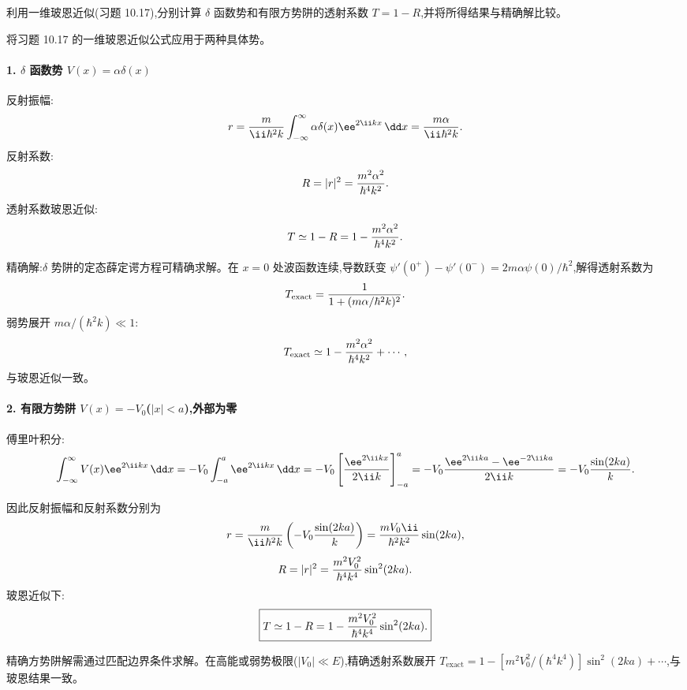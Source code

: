 \begin{question}
利用一维玻恩近似(习题 10.17),分别计算 $\delta$ 函数势和有限方势阱的透射系数 $T=1-R$,并将所得结果与精确解比较。
\end{question}
\begin{solution}
将习题 10.17 的一维玻恩近似公式应用于两种具体势。

\paragraph{1. $\delta$ 函数势 $V(x)=\alpha\delta(x)$}

反射振幅:
\[
r={m\over\ii\hbar^2k}\int_{-\infty}^{\infty}\alpha\delta(x)\ee^{2\ii kx}\,\dd x
={m\alpha\over\ii\hbar^2k}.
\]
反射系数:
\[
R=|r|^2={m^2\alpha^2\over\hbar^4k^2}.
\]
透射系数玻恩近似:
\[
T\simeq1-R=1-{m^2\alpha^2\over\hbar^4k^2}.
\]

精确解:$\delta$ 势阱的定态薛定谔方程可精确求解。在 $x=0$ 处波函数连续,导数跃变 $\psi'(0^+)-\psi'(0^-)=2m\alpha\psi(0)/\hbar^2$,解得透射系数为
\[
T_{\text{exact}}={1\over1+(m\alpha/\hbar^2k)^2}.
\]
弱势展开 $m\alpha/(\hbar^2k)\ll1$:
\[
T_{\text{exact}}\simeq 1-{m^2\alpha^2\over\hbar^4k^2}+\cdots,
\]
与玻恩近似一致。

\paragraph{2. 有限方势阱 $V(x)=-V_0$($|x|<a$),外部为零}

傅里叶积分:
\[
\int_{-\infty}^{\infty}V(x)\ee^{2\ii kx}\,\dd x
=-V_0\int_{-a}^{a}\ee^{2\ii kx}\,\dd x
=-V_0\left[{\ee^{2\ii kx}\over2\ii k}\right]_{-a}^{a}
=-V_0{\ee^{2\ii ka}-\ee^{-2\ii ka}\over2\ii k}
=-V_0{\sin(2ka)\over k}.
\]

因此反射振幅和反射系数分别为
\[
r={m\over\ii\hbar^2k}\left(-V_0{\sin(2ka)\over k}\right)
={m V_0\ii\over\hbar^2k^2}\sin(2ka),
\]
\[
R=|r|^2={m^2 V_0^2\over\hbar^4k^4}\sin^2(2ka).
\]
玻恩近似下:
\[
\boxed{T\simeq1-R=1-{m^2 V_0^2\over\hbar^4k^4}\sin^2(2ka).}
\]

精确方势阱解需通过匹配边界条件求解。在高能或弱势极限($|V_0|\ll E$),精确透射系数展开 $T_{\text{exact}}=1-[m^2V_0^2/(\hbar^4k^4)]\sin^2(2ka)+\cdots$,与玻恩结果一致。
\end{solution}

